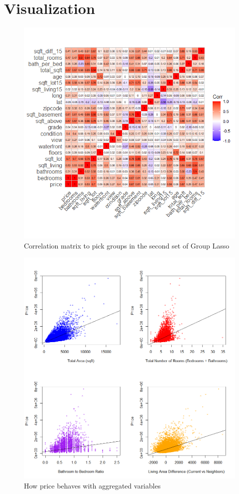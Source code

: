 \documentclass[a4paper, 12pt]{article}
\begin{document}
\pagebreak
\appendix

\section{Visualization}


\begin{figure}[H]
\includegraphics[scale=0.8]{corrmatplot}
\centering
\caption{Correlation matrix to pick groups in the second set of Group Lasso}
\label{fig:corrmatplot}
\end{figure}

\begin{figure}[h]
\includegraphics[scale=0.7]{corrplots}
\centering
\caption{How price behaves with aggregated variables}
\label{fig:corrplots}
\end{figure}
\end{document}
